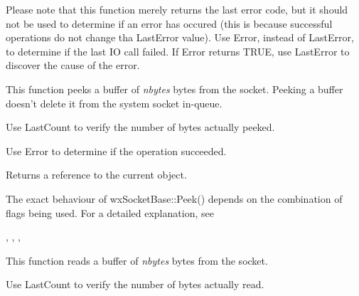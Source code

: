Please note that this function merely returns the last error code,
but it should not be used to determine if an error has occured (this
is because successful operations do not change tha LastError value).
Use Error, instead of LastError, to determine if the last IO call
failed. If Error returns TRUE, use LastError to discover the
cause of the error.

%
%
\label{wxsocketbasepeek}


This function peeks a buffer of {\it nbytes} bytes from the socket. Peeking a buffer
doesn't delete it from the system socket in-queue.

Use LastCount to verify the number of bytes actually peeked.

Use Error to determine if the operation succeeded.





Returns a reference to the current object.


The exact behaviour of wxSocketBase::Peek() depends on the combination
of flags being used. For a detailed explanation, see 


, 
, 
, 

%
%
\label{wxsocketbaseread}


This function reads a buffer of {\it nbytes} bytes from the socket.

Use LastCount to verify the number of bytes actually read.

